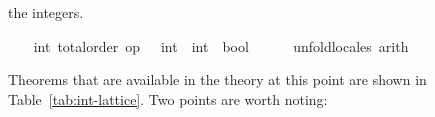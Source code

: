 \begin{isabellebody}
\begin{isamarkuptext}
  the integers.%
\end{isamarkuptext}%
\isamarkuptrue%
%
\isadelimvisible
\ \ %
\endisadelimvisible
%
\isatagvisible
{}\isamarkupfalse%
\ int{}\ total{}order\ {}op\ {}\ {}{}\ int\ {}\ int\ {}\ bool{}\isanewline
\ \ \ \ \isamarkupfalse%
\ unfold{}locales\ arith%
\endisatagvisible
{\isafoldvisible}%
%
\isadelimvisible
%
\endisadelimvisible
%
\begin{isamarkuptext}%
Theorems that are available in the theory at this point are shown in
  Table~\ref{tab:int-lattice}.  Two points are worth noting:


\end{isamarkuptext}
\end{isabellebody}
